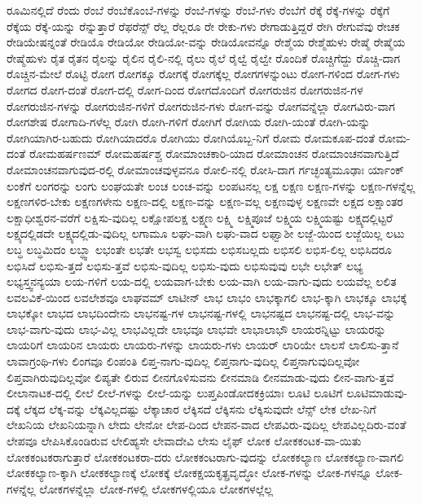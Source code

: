 {ರೂಮಿನಲ್ಲಿದೆ
ರೆಂದು
ರೆಂಬೆ
ರೆಂಬೆಕೊಂಬೆ-ಗಳನ್ನು
ರೆಂಬೆ-ಗಳನ್ನು
ರೆಂಬೆ-ಗಳು
ರೆಂಬೆಗೆ
ರೆಕ್ಕೆ
ರೆಕ್ಕೆ-ಗಳನ್ನು
ರೆಕ್ಕೆಗೆ
ರೆಕ್ಕೆಯ
ರೆಕ್ಕೆ-ಯನ್ನು
ರೆನ್ನುತ್ತಾರೆ
ರೆಫರೆನ್ಸ್
ರೆಲ್ಲ
ರೆಲ್ಲರೂ
ರೇ
ರೇಕು-ಗಳು
ರೇಗಾಡುತ್ತಿದ್ದರೆ
ರೇಗಿ
ರೇಗುವೆವು
ರೇಚಕ
ರೇಡಿಯೇಷನ್ನಂತೆ
ರೇಡಿಯೊ
ರೇಡಿಯೋ
ರೇಡಿಯೋ-ವನ್ನು
ರೇಡಿಯೋವನ್ನೊ
ರೇಶ್ಮೆಯ
ರೇಶ್ಮೆಹುಳು
ರೇಷ್ಮೆ
ರೇಷ್ಮೆಯ
ರೇಷ್ಮೆಹುಳು
ರೈತ
ರೈತನ
ರೈಲನ್ನು
ರೈಲಿನ
ರೈಲಿ-ನಲ್ಲಿ
ರೈಲು
ರೈಲೆ
ರೈಲ್ವೆ
ರೈಲ್ವೇ
ರೊಂದಿಕೆ
ರೊಚ್ಚಿಗೆದ್ದು
ರೊಚ್ಚಿ-ದಾಗ
ರೊಚ್ಚಿನ-ಮೇಲೆ
ರೊಟ್ಟಿ
ರೋಗ
ರೋಗಕ್ಕೂ
ರೋಗಕ್ಕೆ
ರೋಗಕ್ಕೆಲ್ಲ
ರೋಗಗಳನ್ನುಂಟು
ರೋಗ-ಗಳಿಂದ
ರೋಗ-ಗಳು
ರೋಗದ
ರೋಗ-ದಂತೆ
ರೋಗ-ದಲ್ಲಿ
ರೋಗ-ದಿಂದ
ರೋಗದೊಂದಿಗೆ
ರೋಗರುಜಿನ
ರೋಗರುಜಿನ-ಗಳ
ರೋಗರುಜಿನ-ಗಳನ್ನು
ರೋಗರುಜಿನ-ಗಳಿಗೆ
ರೋಗರುಜಿನ-ಗಳು
ರೋಗ-ವನ್ನು
ರೋಗವನ್ನೆಲ್ಲಾ
ರೋಗವಿರು-ವಾಗ
ರೋಗಶೇಷ
ರೋಗಾದಿ-ಗಳೆಲ್ಲ
ರೋಗಿ
ರೋಗಿ-ಗಳಿಗೆ
ರೋಗಿಗೆ
ರೋಗಿಯ
ರೋಗಿ-ಯಂತೆ
ರೋಗಿ-ಯನ್ನು
ರೋಗಿಯಾಗಿರ-ಬಹುದು
ರೋಗಿಯಾದರೊ
ರೋಗಿಯು
ರೋಗಿಯೊಬ್ಬ-ನಿಗೆ
ರೋಮ
ರೋಮಕೂಪ-ದಂತೆ
ರೋಮ-ದಂತೆ
ರೋಮಹರ್ಷಣಮ್
ರೋಮಹರ್ಷಶ್ಚ
ರೋಮಾಂಚಕಾರಿ-ಯಾದ
ರೋಮಾಂಚನ
ರೋಮಾಂಚನವಾಗುತ್ತಿದೆ
ರೋಮಾಂಚನವಾಗುವುದ-ರಲ್ಲಿ
ರೋಮಾಂಚವುಳ್ಳವನೂ
ರೋಲಿ-ನಲ್ಲಿ
ರೋಸಿ-ದಾಗ
ರ್ಗಚ್ಛಂತ್ಯಮೂಢಾಃ
ರ್ಯಾಂಕ್
ಲಂಕೆಗೆ
ಲಂಗರನ್ನು
ಲಂಗು
ಲಂಘಯತೇ
ಲಂಚ
ಲಂಚ-ವನ್ನು
ಲಂಪಟನಲ್ಲ
ಲಕ್ಷ
ಲಕ್ಷಣ
ಲಕ್ಷಣ-ಗಳನ್ನು
ಲಕ್ಷಣ-ಗಳನ್ನೆಲ್ಲ
ಲಕ್ಷಣಗಳಿರ-ಬೇಕು
ಲಕ್ಷಣಗಳೇನು
ಲಕ್ಷಣ-ದಲ್ಲಿ
ಲಕ್ಷಣ-ವನ್ನು
ಲಕ್ಷಣ-ವಲ್ಲ
ಲಕ್ಷಣವುಳ್ಳ
ಲಕ್ಷಣವೇ
ಲಕ್ಷದ
ಲಕ್ಷಾಂತರ
ಲಕ್ಷಾಧೀಶ್ವರನ-ವರೆಗೆ
ಲಕ್ಷಿಸು-ವುದಿಲ್ಲ
ಲಕ್ಷೋಪಲಕ್ಷ
ಲಕ್ಷ್ಮಣ
ಲಕ್ಷ್ಮಿ
ಲಕ್ಷ್ಮಿಪೂಜೆ
ಲಕ್ಷ್ಮಿಯ
ಲಕ್ಷ್ಮಿಯಷ್ಟು
ಲಕ್ಷ್ಯದಲ್ಲಿಟ್ಟರೆ
ಲಕ್ಷ್ಯದಲ್ಲಿಡದೇ
ಲಕ್ಷ್ಯದಲ್ಲಿಡು-ವುದಿಲ್ಲ
ಲಗಾಮೂ
ಲಘು-ವಾಗಿ
ಲಘು-ವಾದ
ಲಘ್ವಾಶೀ
ಲಜ್ಜೆ-ಯಿಂದ
ಲಜ್ಜೆಯಿಲ್ಲ
ಲಟು
ಲಬ್ಧ
ಲಬ್ಧಮಿದಂ
ಲಬ್ಧ್ವಾ
ಲಭಂತೇ
ಲಭತೇ
ಲಭಸ್ವ
ಲಭಿಸದು
ಲಭಿಸಬಲ್ಲದು
ಲಭಿಸಲಿ
ಲಭಿಸ-ಲಿಲ್ಲ
ಲಭಿಸಿದರೂ
ಲಭಿಸಿದೆ
ಲಭಿಸು-ತ್ತದೆ
ಲಭಿಸು-ತ್ತವೆ
ಲಭಿಸು-ವುದಿಲ್ಲ
ಲಭಿಸು-ವುದು
ಲಭಿಸುವುವು
ಲಭೇ
ಲಭೇತ್
ಲಭ್ಯ
ಲಭ್ಯಸ್ತ್ವನನ್ಯಯಾ
ಲಯ-ಗಳಿಗೆ
ಲಯ-ದಲ್ಲಿ
ಲಯವಾಗ-ಬೇಕು
ಲಯ-ವಾಗಿ
ಲಯ-ವಾಗು-ವುದು
ಲಯವೆಲ್ಲ
ಲಲಿತ
ಲವಲವಿಕೆ-ಯಿಂದ
ಲವಲೇಶವೂ
ಲಾಘವಮ್
ಲಾಟೀನ್
ಲಾಭ
ಲಾಭಂ
ಲಾಭಕ್ಕಾಗಲಿ
ಲಾಭ-ಕ್ಕಾಗಿ
ಲಾಭಕ್ಕೂ
ಲಾಭಕ್ಕೆ
ಲಾಭಕ್ಕೋ
ಲಾಭದ
ಲಾಭದಿಂದೇನು
ಲಾಭನಷ್ಟ-ಗಳ
ಲಾಭನಷ್ಟ-ಗಳಲ್ಲಿ
ಲಾಭನಷ್ಟದ
ಲಾಭನಷ್ಟ-ದಲ್ಲಿ
ಲಾಭ-ವನ್ನು
ಲಾಭ-ವಾಗು-ವುದು
ಲಾಭ-ವಿಲ್ಲ
ಲಾಭವಿಲ್ಲದೇ
ಲಾಭವೂ
ಲಾಭವೇ
ಲಾಭಾಲಾಭೌ
ಲಾಯರನ್ನಿಟ್ಟು
ಲಾಯರನ್ನು
ಲಾಯರಿಗೆ
ಲಾಯರಿನ
ಲಾಯರು
ಲಾಯರು-ಗಳನ್ನು
ಲಾಯರು-ಗಳು
ಲಾಯರ್
ಲಾರಿಯೇ
ಲಾಲಸೆ
ಲಾಲಿಸು-ತ್ತಾನೆ
ಲಾವಾಗ್ರಂಥಿ-ಗಳು
ಲಿಂಗವೂ
ಲಿಂಪಂತಿ
ಲಿಪ್ತ-ನಾಗು-ವುದಿಲ್ಲ
ಲಿಪ್ತನಾಗು-ವುದಿಲ್ಲ
ಲಿಪ್ತನಾಗುವುದಿಲ್ಲವೋ
ಲಿಪ್ತವಾಗಿರುವುದಿಲ್ಲವೋ
ಲಿಪ್ಯತೇ
ಲಿರುವ
ಲೀನಗೊಳಿಸುವನು
ಲೀನಮಾಡಿ
ಲೀನಮಾಡು-ವುದು
ಲೀನ-ವಾಗು-ತ್ತವೆ
ಲೀಲಾನಾಟಕ-ದಲ್ಲಿ
ಲೀಲೆ
ಲೀಲೆ-ಗಳನ್ನು
ಲೀಲೆ-ಯನ್ನು
ಲುಪ್ತಪಿಂಡೋದಕಕ್ರಿಯಾಃ
ಲೂಟಿ
ಲೂಟಿಗೆ
ಲೂಟಿಮಾಡುವು-ದಕ್ಕೆ
ಲೆಕ್ಕದ
ಲೆಕ್ಕ-ವನ್ನು
ಲೆಕ್ಕವಿಲ್ಲದಷ್ಟು
ಲೆಕ್ಕಾಚಾರ
ಲೆಕ್ಕಿಸದೆ
ಲೆಕ್ಕಿಸನು
ಲೆಕ್ಕಿಸುವುದೇ
ಲೆನ್ಸ್
ಲೇಕ
ಲೇಖ-ನಿಗೆ
ಲೇಖನಿಯ
ಲೇಖನಿಯನ್ನಾಗಿ
ಲೇದು
ಲೇನೋ
ಲೇಪ-ದಿಂದ
ಲೇಪನ-ವಾದ
ಲೇಪವಿರು-ವುದಿಲ್ಲ
ಲೇಪವಿಲ್ಲದಿರು-ವಂತೆ
ಲೇಪವೂ
ಲೇಪಿಸಿಕೊಂಡಿರುವ
ಲೇಲಿಹ್ಯಸೇ
ಲೇವಾದೇವಿ
ಲೇಸು
ಲೈಫ್
ಲೋಕ
ಲೋಕಕಂಟಕ-ವಾ-ಯಿತು
ಲೋಕಕಂಟಕರಾಗುತ್ತಾರೆ
ಲೋಕಕಂಟಕರಾ-ದರು
ಲೋಕಕಂಟರಾಗು-ವುದನ್ನು
ಲೋಕಕಲ್ಯಾಣ
ಲೋಕಕಲ್ಯಾಣ-ವಾಗಲಿ
ಲೋಕಕಲ್ಯಾಣ-ಕ್ಕಾಗಿ
ಲೋಕಕಲ್ಯಾಣಕ್ಕೆ
ಲೋಕಕ್ಕೆ
ಲೋಕಕ್ಷಯಕೃತ್ಪ್ರವೃದ್ಧೋ
ಲೋಕ-ಗಳನ್ನು
ಲೋಕ-ಗಳನ್ನೂ
ಲೋಕ-ಗಳನ್ನೆಲ್ಲ
ಲೋಕಗಳನ್ನೆಲ್ಲಾ
ಲೋಕ-ಗಳಲ್ಲಿ
ಲೋಕಗಳಲ್ಲಿಯೂ
ಲೋಕಗಳಲ್ಲೆಲ್ಲ
}
